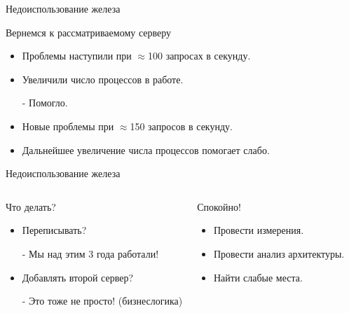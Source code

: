 \documentclass[aspectratio=169]{beamer}
\begin{document}
\begin{frame}{Недоиспользование железа}
    \begin{block}{Вернемся к рассматриваемому серверу}
        \begin{itemize}
            \item Проблемы наступили при $\approx$100 запросах в секунду.

            \item Увеличили число процессов в работе.
                \par - Помогло.

            \item Новые проблемы при $\approx$150 запросов в секунду.

            \item Дальнейшее увеличение числа процессов помогает слабо.
        \end{itemize}
    \end{block}
\end{frame}

\begin{frame}{Недоиспользование железа}
    \begin{columns}
        \begin{block}{Что делать?}
            \begin{itemize}
                \pause\item Переписывать?
                    \pause\par - Мы над этим 3 года работали!

                \pause\item Добавлять второй сервер?
                    \pause\par - Это тоже не просто! (бизнеслогика)
            \end{itemize}
        \end{block}

        \begin{block}{Спокойно!}
            \begin{itemize}
                \item Провести измерения.
                \item Провести анализ архитектуры.
                \item Найти слабые места.
            \end{itemize}
        \end{block}
    \end{columns}
\end{frame}
\end{document}
